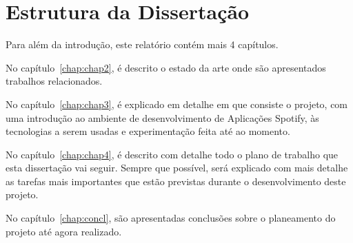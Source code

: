 \section{Estrutura da Dissertação} \label{sec:struct}

Para além da introdução, este relatório contém mais 4 capítulos.

No capítulo~\ref{chap:chap2}, é descrito o estado da arte onde são
apresentados trabalhos relacionados.

No capítulo~\ref{chap:chap3}, é explicado em detalhe em que consiste o projeto, com uma introdução ao ambiente de desenvolvimento de Aplicações Spotify, às tecnologias a serem usadas e experimentação feita até ao momento.

No capítulo~\ref{chap:chap4}, é descrito com detalhe todo o plano de trabalho que esta dissertação vai seguir. 
Sempre que possível, será explicado com mais detalhe as tarefas mais importantes que estão previstas durante o desenvolvimento deste projeto.

No capítulo~\ref{chap:concl}, são apresentadas conclusões sobre o planeamento do projeto até agora realizado.
